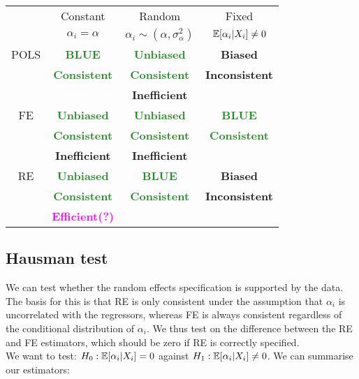 \documentclass[DIV=14,titlepage=false]{scrreprt}
\begin{document}
\begin{table}[h]
    \begin{tabular}{|c|c|c|c|}
        \hline
        & Constant & Random & Fixed \\
        & $\alpha_i = \alpha$ & $\alpha_i \sim (\alpha, \sigma^2_\alpha)$ & $\mathbb{E}[\alpha_i|X_i] \not = 0$ \\
        \hline
        POLS & \textcolor{ForestGreen}{\textbf{BLUE}} & \textcolor{ForestGreen}{\textbf{Unbiased}} & \textcolor{BrickRed}{\textbf{Biased}} \\
        & \textcolor{ForestGreen}{\textbf{Consistent}} & \textcolor{ForestGreen}{\textbf{Consistent}} & \textcolor{BrickRed}{\textbf{Inconsistent}} \\
        & & \textcolor{BrickRed}{\textbf{Inefficient}} & \\
        \hline
        FE & \textcolor{ForestGreen}{\textbf{Unbiased}} & \textcolor{ForestGreen}{\textbf{Unbiased}} & \textcolor{ForestGreen}{\textbf{BLUE}} \\
        & \textcolor{ForestGreen}{\textbf{Consistent}} & \textcolor{ForestGreen}{\textbf{Consistent}} & \textcolor{ForestGreen}{\textbf{Consistent}} \\
        & \textcolor{BrickRed}{\textbf{Inefficient}} & \textcolor{BrickRed}{\textbf{Inefficient}} &  \\
        \hline
        RE & \textcolor{ForestGreen}{\textbf{Unbiased}} & \textcolor{ForestGreen}{\textbf{BLUE}} & \textcolor{BrickRed}{\textbf{Biased}} \\
        & \textcolor{ForestGreen}{\textbf{Consistent}} & \textcolor{ForestGreen}{\textbf{Consistent}} & \textcolor{BrickRed}{\textbf{Inconsistent}} \\
        & \textcolor{magenta}{\textbf{Efficient(?)}}&  & \\
        \hline
    \end{tabular}
\end{table}
\subsection{Hausman test}
We can test whether the random effects specification is supported by the data. The basis for this is that RE is only consistent under the assumption that $\alpha_i$ is uncorrelated with the regressors, whereas FE is always consistent regardless of the conditional distribution of $\alpha_i$. We thus test on the difference between the RE and FE estimators, which should be zero if RE is correctly specified.\\
We want to test: $H_0: \mathbb{E}[\alpha_i|X_i] = 0$ against $H_1: \mathbb{E}[\alpha_i|X_i] \not = 0$. We can summarise our estimators:
\end{document}
